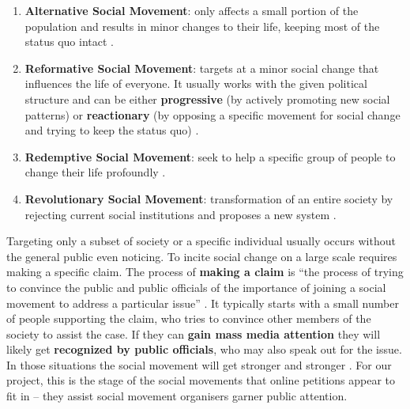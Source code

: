 \begin{enumerate}
	\item \textbf{Alternative Social Movement}: only affects a small portion of the population and results in minor changes to their life, keeping most of the status quo intact \citep[pg. 549]{Macionis12}.
    \item \textbf{Reformative Social Movement}: targets at a minor social change that influences the life of everyone. It usually works with the given political structure and can be either \textbf{progressive} (by actively promoting new social patterns) or \textbf{reactionary} (by opposing a specific movement for social change and trying to keep the status quo) \citep[pg. 549]{Macionis12}.
    \item \textbf{Redemptive Social Movement}: seek to help a specific group of people to change their life profoundly \citep[pg. 549]{Macionis12}.
    \item \textbf{Revolutionary Social Movement}: transformation of an entire society by rejecting current social institutions and proposes a new system \citep[pg. 549]{Macionis12}.
\end{enumerate}

Targeting only a subset of society or a specific individual usually occurs without the general public even noticing. To incite social change on a large scale requires making a specific claim. The process of \textbf{making a claim} is ``the process of trying to convince the public and public officials of the importance of joining a social movement to address a particular issue'' \citep[pg. 549]{Macionis12}. It typically starts with a small number of people supporting the claim, who tries to convince other members of the society to assist the case. If they can \textbf{gain mass media attention} they will likely get \textbf{recognized by public officials}, who may also speak out for the issue. In those situations the social movement will get stronger and stronger \citep[pg. 549]{Macionis12}. For our project, this is the stage of the social movements that online petitions appear to fit in -- they assist social movement organisers garner public attention.\par\vspace{0.2cm}

